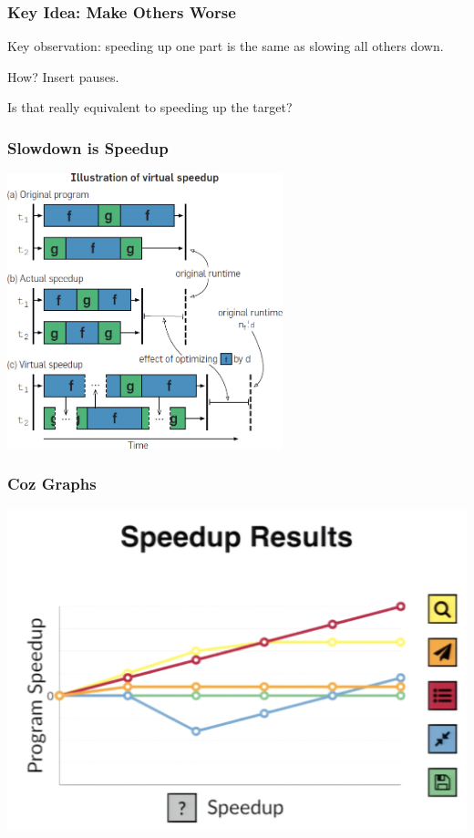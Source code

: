 \begin{frame}
\frametitle{Key Idea: Make Others Worse}

Key observation: speeding up one part is the same as slowing all others down.

How? Insert pauses.

Is that really equivalent to speeding up the target?

\end{frame}


\begin{frame}
\frametitle{Slowdown is Speedup}

\begin{center}
	\includegraphics[width=0.6\textwidth]{images/virtual-speedup.jpg}
\end{center}

\end{frame}


\begin{frame}
\frametitle{Coz Graphs}

\begin{center}
	\includegraphics[width=\textwidth]{images/coz-speedup-graph.png}
\end{center}

\end{frame}


